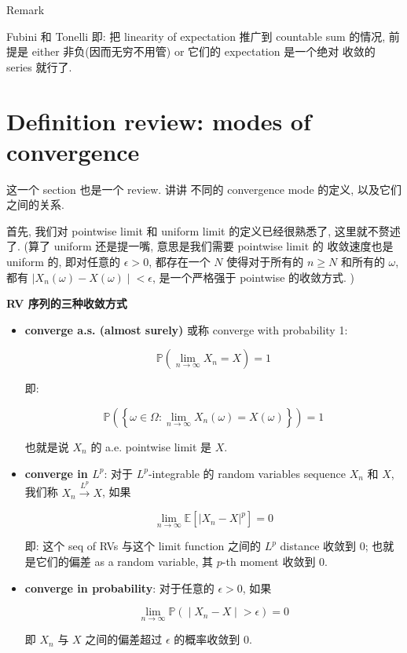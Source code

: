 \documentclass{qlnotes-export}
\begin{document}
\begin{qlremark}{Remark}

Fubini 和 Tonelli 即: 把 linearity of expectation 推广到 countable sum 的情况, 前提是 either 非负(因而无穷不用管) or 它们的 expectation 是一个绝对 收敛的 series 就行了.

\end{qlremark}

\section{Definition review: modes of convergence}\label{definition-review-modes-of-convergence}

这一个 section 也是一个 review. 讲讲 不同的 convergence mode 的定义, 以及它们之间的关系.

首先, 我们对 pointwise limit 和 uniform limit 的定义已经很熟悉了, 这里就不赘述了. (算了 uniform 还是提一嘴, 意思是我们需要 pointwise limit 的 收敛速度也是 uniform 的, 即对任意的 \(\epsilon > 0\), 都存在一个 \(N\) 使得对于所有的 \(n \geq N\) 和所有的 \(\omega\), 都有 \(\left. |X_{n}(\omega) - X(\omega) \middle| < \epsilon \right.\), 是一个严格强于 pointwise 的收敛方式. )

\begin{definition}{\protect{}\label{kn-modes-of-convergence-for-random-variables}{\textbf{RV
序列的三种收敛方式}}}

\begin{itemize}
\item
  \textbf{converge a.s. (almost surely)} 或称 converge with probability 1:

  \[{\mathbb{P}}\left( {\lim\limits_{n\rightarrow\infty}X_{n} = X} \right) = 1\]

  即:

  \[{\mathbb{P}}\left( \left\{ {\omega \in \Omega:\lim\limits_{n\rightarrow\infty}X_{n}(\omega) = X(\omega)} \right\} \right) = 1\]

  也就是说 \(X_{n}\) 的 a.e. pointwise limit 是 \(X\).
\item
  \textbf{converge in \(L^{p}\)}: 对于 \(L^{p}\)-integrable 的 random variables sequence \(X_{n}\) 和 \(X\), 我们称 \(X_{n}\overset{L^{p}}{\rightarrow}X\), 如果

  \[\lim\limits_{n\rightarrow\infty}{\mathbb{E}}\left\lbrack \left| {X_{n} - X} \right|^{p} \right\rbrack = 0\]

  即: 这个 seq of RVs 与这个 limit function 之间的 \(L^{p}\) distance 收敛到 0; 也就是它们的偏差 as a random variable, 其 \(p\)-th moment 收敛到 0.
\item
  \textbf{converge in probability}: 对于任意的 \(\epsilon > 0\), 如果

  \[\left. \lim\limits_{n\rightarrow\infty}{\mathbb{P}}( \middle| X_{n} - X \middle| > \epsilon) = 0 \right.\]

  即 \(X_{n}\) 与 \(X\) 之间的偏差超过 \(\epsilon\) 的概率收敛到 0.
\end{itemize}

\end{definition}
\end{document}
